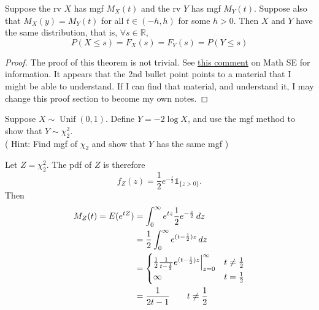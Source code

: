 \documentclass[notoc,notitlepage]{tufte-book}
\DeclareMathOperator{\Unif}{Unif }
\begin{document}
\begin{thm}
\label{thm:uniqueness_of_the_mgf}
  Suppose the rv $X$ has mgf $M_X(t)$ and the rv $Y$ has mgf $M_Y(t)$. Suppose also that $M_X(y) = M_Y(t)$ for all $t \in (-h, h)$ for some $h > 0$. Then $X$ and $Y$ have the same distribution, that is, $\forall s \in \mathbb{R}$,
  \begin{equation*}
    P(X \leq s) = F_X(s) = F_Y(s) = P(Y \leq s)
  \end{equation*}
\end{thm}

\begin{proof}
  The proof of this theorem is not trivial. See \href{https://math.stackexchange.com/q/2388038}{this comment} on Math SE for information. It appears that the 2nd bullet point points to a material that I might be able to understand. If I can find that material, and understand it, I may change this proof section to become my own notes.
\end{proof}

\begin{eg}[Example 2.29]
  Suppose $X \sim \Unif(0, 1)$. Define $Y = -2 \log X$, and use the mgf method to show that $Y \sim \chi_2^2$.\\
\noindent ( Hint: Find mgf of $\chi_2$ and show that $Y$ has the same mgf )

  \begin{solution}
    Let $Z = \chi_2^2$. The pdf of $Z$ is therefore
    \begin{equation*}
      f_Z (z) = \frac{1}{2} e^{- \frac{z}{2}} \mathbb{1}_{\{z > 0\}}.
    \end{equation*}
    Then
    \begin{align*}
      M_Z(t) = E(e^{tZ}) &= \int_{0}^{\infty} e^{tz} \frac{1}{2} e^{- \frac{z}{2}} \mathop{}\!d{z} \\
        &= \frac{1}{2} \int_{0}^{\infty} e^{(t - \frac{1}{2}) z} \mathop{}\!d{z} \\
        &= \begin{cases} 
          \frac{1}{2} \frac{1}{t - \frac{1}{2}} e^{(t - \frac{1}{2}) z} \Big|_{z = 0}^{\infty} & t \neq \frac{1}{2} \\
          \infty & t = \frac{1}{2}
        \end{cases} \\
        &= \frac{1}{2t - 1} \qquad t \neq \frac{1}{2}
    \end{align*}
  \end{solution}
\end{eg}
\end{document}

